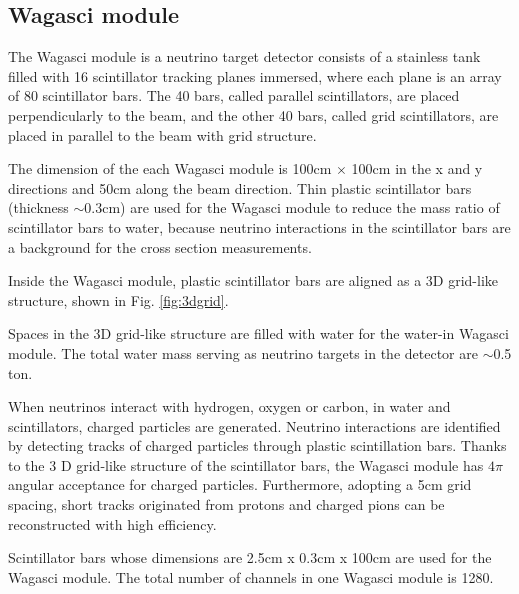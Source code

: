 \subsection{Wagasci module}
The Wagasci module is a neutrino target detector consists of a stainless tank filled with 16 scintillator tracking planes immersed, where each plane is an array of 80 scintillator bars.
The 40 bars, called parallel scintillators, are placed perpendicularly to the beam, and the other 40 bars, called grid scintillators, are placed in parallel to the beam with grid structure.

The dimension of the each Wagasci module is 100cm $\times$ 100cm in the x and y directions
and 50cm along the beam direction.
Thin plastic scintillator bars (thickness $\sim 0.3$cm) are used for the Wagasci module
to reduce  the mass ratio of scintillator bars to water,
because neutrino interactions in the scintillator bars are a background for the cross section measurements.

Inside the Wagasci module, plastic scintillator bars are aligned as a 3D grid-like structure, shown in Fig. \ref{fig:3dgrid}.


Spaces in the 3D grid-like structure are filled with water for the water-in Wagasci module.
The total water mass serving as neutrino targets in the detector are $\sim$0.5 ton.

When neutrinos interact with hydrogen, oxygen or carbon, in water and scintillators,
charged particles are generated.
Neutrino interactions are identified by detecting tracks of charged particles through plastic scintillation bars.
Thanks to the 3 D grid-like structure of the scintillator bars, 
the Wagasci module has $4\pi$ angular acceptance for charged particles.
Furthermore, adopting a 5cm grid spacing, short tracks originated from protons and charged pions can be reconstructed
with high efficiency.

Scintillator bars whose dimensions are 2.5cm x 0.3cm x 100cm are used for the Wagasci module.
The total number of channels in one Wagasci module is 1280.


